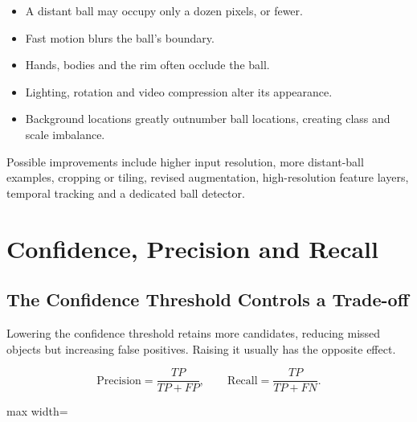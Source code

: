 \documentclass[11pt,a4paper,oneside]{report}
\begin{document}
\begin{itemize}
  \item A distant ball may occupy only a dozen pixels, or fewer.
  \item Fast motion blurs the ball's boundary.
  \item Hands, bodies and the rim often occlude the ball.
  \item Lighting, rotation and video compression alter its appearance.
  \item Background locations greatly outnumber ball locations, creating class and scale imbalance.
\end{itemize}

Possible improvements include higher input resolution, more distant-ball examples, cropping or tiling, revised augmentation, high-resolution feature layers, temporal tracking and a dedicated ball detector.

\section{Confidence, Precision and Recall}

\subsection{The Confidence Threshold Controls a Trade-off}

Lowering the confidence threshold retains more candidates, reducing missed objects but increasing false positives. Raising it usually has the opposite effect.

\[
\mathrm{Precision}=\frac{TP}{TP+FP},
\qquad
\mathrm{Recall}=\frac{TP}{TP+FN}.
\]

\begin{center}
\begin{adjustbox}{max width=\linewidth}
\end{adjustbox}
\end{center}
\end{document}
